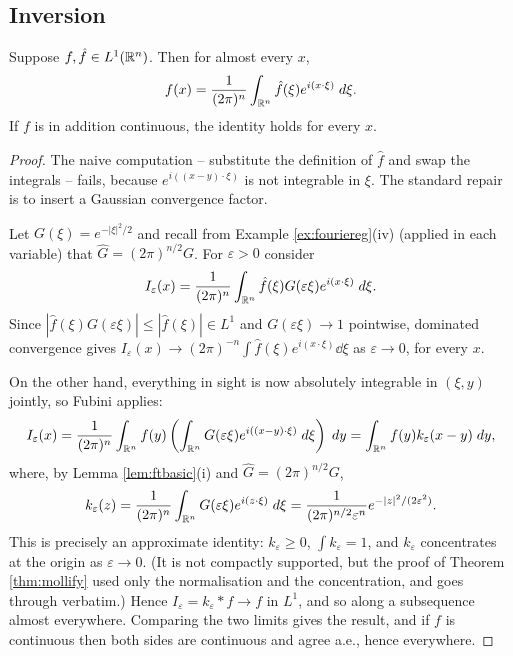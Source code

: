 \documentclass[a4paper]{scrartcl}
\begin{document}
\subsection{Inversion}

\begin{theorem}\label{thm:ftinv}
	Suppose $f, \hat f \in L^1(\mathbb{R}^n)$. Then for almost every $x$,
	$$f(x) = \frac{1}{(2\pi)^n}\int_{\mathbb{R}^n}\hat f(\xi)e^{i(x\cdot\xi)}\; d \xi.$$
	If $f$ is in addition continuous, the identity holds for every $x$.
\end{theorem}

\begin{proof}
	The naive computation -- substitute the definition of $\hat f$ and swap the integrals -- fails, because $e^{i((x-y)\cdot\xi)}$ is not integrable in $\xi$. The standard repair is to insert a Gaussian convergence factor.

	Let $G(\xi) = e^{-|\xi|^2/2}$ and recall from Example \ref{ex:fouriereg}(iv) (applied in each variable) that $\hat G = (2\pi)^{n/2}G$. For $\varepsilon > 0$ consider
	$$I_\varepsilon(x) = \frac{1}{(2\pi)^n}\int_{\mathbb{R}^n} \hat f(\xi)G(\varepsilon\xi)e^{i(x\cdot\xi)}\; d\xi.$$
	Since $|\hat f(\xi)G(\varepsilon\xi)|\le|\hat f(\xi)| \in L^1$ and $G(\varepsilon\xi)\to 1$ pointwise, dominated convergence gives $I_\varepsilon(x) \to (2\pi)^{-n}\int \hat f(\xi)e^{i(x\cdot\xi)}\dd\xi$ as $\varepsilon\to 0$, for every $x$.

	On the other hand, everything in sight is now absolutely integrable in $(\xi,y)$ jointly, so Fubini applies:
	$$I_\varepsilon(x) = \frac{1}{(2\pi)^n}\int_{\mathbb{R}^n} f(y)\left( \int_{\mathbb{R}^n}G(\varepsilon\xi)e^{i((x-y)\cdot\xi)}\; d\xi\right)\; d y = \int_{\mathbb{R}^n}f(y)k_\varepsilon(x-y)\; d y,$$
	where, by Lemma \ref{lem:ftbasic}(i) and $\hat G = (2\pi)^{n/2}G$,
	$$k_\varepsilon(z) = \frac{1}{(2\pi)^n}\int_{\mathbb{R}^n}G(\varepsilon\xi)e^{i(z\cdot\xi)}\; d\xi = \frac{1}{(2\pi)^{n/2}\varepsilon^n}e^{-|z|^2/(2\varepsilon^2)}.$$
	This is precisely an approximate identity: $k_\varepsilon \ge 0$, $\int k_\varepsilon = 1$, and $k_\varepsilon$ concentrates at the origin as $\varepsilon \to 0$. (It is not compactly supported, but the proof of Theorem \ref{thm:mollify} used only the normalisation and the concentration, and goes through verbatim.) Hence $I_\varepsilon = k_\varepsilon * f \to f$ in $L^1$, and so along a subsequence almost everywhere. Comparing the two limits gives the result, and if $f$ is continuous then both sides are continuous and agree a.e., hence everywhere.
\end{proof}
\end{document}

